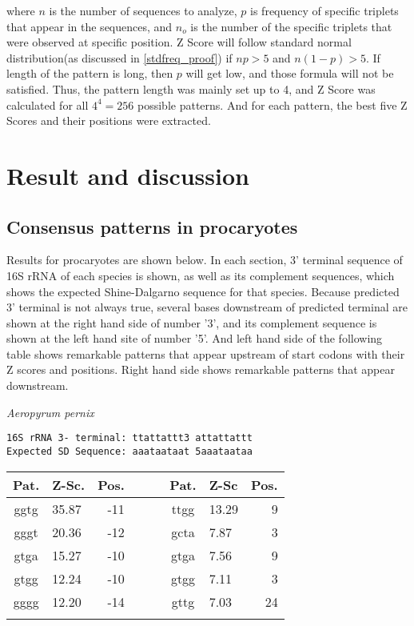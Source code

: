 \noindent
where \(n\) is the number of sequences to analyze, \(p\) is frequency
of specific triplets that appear in the sequences, and \(n_{o}\) is
the number of the specific triplets that were observed at specific
position. Z Score will follow standard normal distribution(as
discussed in \ref{stdfreq_proof}) if \(np > 5\) and \(n(1-p) > 5\). If
length of the pattern is long, then \(p\) will get low, and those
formula will not be satisfied. Thus, the pattern length was mainly set
up to 4, and Z Score was calculated for all
\(4^{4} = 256\) possible patterns. And for each pattern, the 
best five Z Scores and their positions were extracted.


\section{Result and discussion}

\subsection{Consensus patterns in procaryotes}
\label{bct_consensus}

Results for procaryotes are shown below. In each section, 3' terminal
sequence of 16S rRNA of each species is shown, as well as its
complement sequences, which shows the expected Shine-Dalgarno sequence
for that species. Because predicted 3' terminal is not always true,
several bases downstream of predicted terminal are shown at the right
hand side of number '3', and its complement sequence is shown at the
left hand site of number '5'. And left hand side of the following
table shows remarkable patterns that appear upstream of start codons
with their Z scores and positions. Right hand side shows remarkable
patterns that appear downstream.

\vspace{1em}
\noindent
{\it Aeropyrum pernix }
\begin{verbatim}
16S rRNA 3- terminal: ttattattt3 attattattt
Expected SD Sequence: aaataataat 5aaataataa
\end{verbatim}

\noindent
\begin{center}
\begin{tabular}{clrcclr}
Pat. & Z-Sc. & Pos. & \verb+   + & Pat. & Z-Sc & Pos. \\
\hline
ggtg & 35.87 & -11 &  & ttgg & 13.29 & 9 \\
gggt & 20.36 & -12 &  & gcta & 7.87 & 3 \\
gtga & 15.27 & -10 &  & gtga & 7.56 & 9 \\
gtgg & 12.24 & -10 &  & gtgg & 7.11 & 3 \\
gggg & 12.20 & -14 &  & gttg & 7.03 & 24 \\
    &     \\
\end{tabular}
\end{center}

